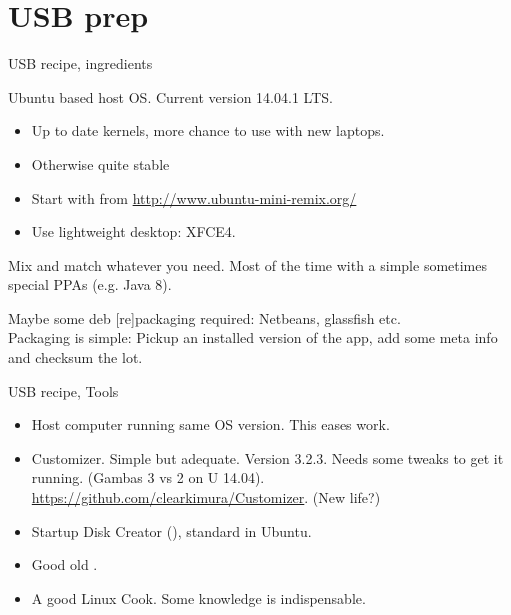 \section{USB prep}
\begin{frame}{USB recipe, ingredients}
  \begin{description}[short]
  \item[Distribution] Ubuntu based host OS. Current version 14.04.1 LTS.
    \begin{itemize}
    \item Up to date kernels, more chance to use with new laptops.
    \item Otherwise quite stable
    \item Start with  from
      \url{http://www.ubuntu-mini-remix.org/}
    \item Use lightweight desktop: XFCE4.
    \end{itemize}
  \item[Apps]  Mix and match whatever you need. Most of the time with a
    simple  sometimes special PPAs (e.g. Java 8).
  \item[Home grown packages] Maybe some deb [re]packaging required:
    Netbeans, glassfish etc.\\
    Packaging is simple: Pickup an installed version of the app, add some meta
    info and checksum the lot.
  \end{description}
\end{frame}
\begin{frame}{USB recipe, Tools}
    \begin{itemize}
    \item Host computer running same OS version. This eases work.
    \item Customizer. Simple but adequate. Version 3.2.3. Needs some
      tweaks to get it running. (Gambas 3 vs 2 on U 14.04).
      \url{https://github.com/clearkimura/Customizer}. (New life?)
    \item Startup Disk Creator (),
      standard in Ubuntu.
    \item Good old .
    \item A good Linux Cook. Some knowledge is indispensable.
  \end{itemize}
\end{frame}
